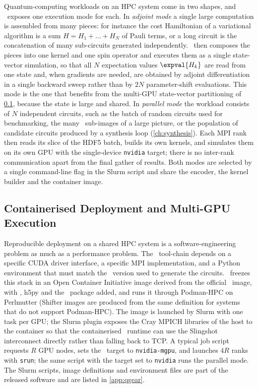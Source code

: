 Quantum-computing workloads on an HPC system come in two shapes, and \qgear\ exposes one execution mode for each. In \emph{adjoint mode} a single large computation is assembled from many pieces: for instance the cost Hamiltonian of a variational algorithm is a sum $H=H_{1}+\dots+H_{N}$ of Pauli terms, or a long circuit is the concatenation of many sub-circuits generated independently. \qgear\ then composes the pieces into one kernel and one spin operator and executes them as a single state-vector simulation, so that all $N$ expectation values $\expval{H_{k}}$ are read from one state and, when gradients are needed, are obtained by adjoint differentiation \cite{jones2020adjoint} in a single backward sweep rather than by $2N$ parameter-shift evaluations. This mode is the one that benefits from the multi-GPU state-vector partitioning of \cref{sec:qgear:deploy}, because the state is large and shared. In \emph{parallel mode} the workload consists of $N$ independent circuits, such as the batch of random circuits used for benchmarking, the many \qcrank\ sub-images of a large picture, or the population of candidate circuits produced by a synthesis loop (\cref{ch:synthesis}). Each MPI rank then reads its slice of the HDF5 batch, builds its own kernels, and simulates them on its own GPU with the single-device \texttt{nvidia} target; there is no inter-rank communication apart from the final gather of results. Both modes are selected by a single command-line flag in the Slurm script and share the encoder, the kernel builder and the container image.

\subsection{Containerised Deployment and Multi-GPU Execution}\label{sec:qgear:deploy}

Reproducible deployment on a shared HPC system is a software-engineering problem as much as a performance problem. The \cudaq\ tool-chain depends on a specific CUDA driver interface, a specific MPI implementation, and a Python environment that must match the \qiskit\ version used to generate the circuits. \qgear\ freezes this stack in an Open Container Initiative image derived from the official \cudaq\ image, with \qiskit, h5py and the \qgear\ package added, and runs it through Podman-HPC on Perlmutter \cite{stephey2022podman} (Shifter images are produced from the same definition for systems that do not support Podman-HPC). The image is launched by Slurm with one task per GPU; the Slurm plugin exposes the Cray MPICH libraries of the host to the container so that the containerised \cudaq\ runtime can use the Slingshot interconnect directly rather than falling back to TCP. A typical job script requests $R$ GPU nodes, sets the \cudaq\ target to \texttt{nvidia-mgpu}, and launches $4R$ ranks with \texttt{srun}; the same script with the target set to \texttt{nvidia} runs the parallel mode. The Slurm scripts, image definitions and environment files are part of the released software \cite{guo2025qgearsoftware} and are listed in \cref{app:qgear}.

